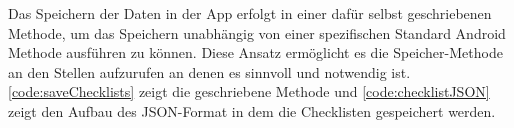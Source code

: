 Das Speichern der Daten in der App erfolgt in einer dafür selbst geschriebenen Methode, um das Speichern unabhängig von einer spezifischen Standard Android Methode ausführen zu können. Diese Ansatz ermöglicht es die Speicher-Methode an den Stellen aufzurufen an denen es sinnvoll und notwendig ist. \autoref{code:saveChecklists} zeigt die geschriebene Methode und \autoref{code:checklistJSON} zeigt den Aufbau des \ac{JSON}-Format in dem die Checklisten gespeichert werden.
\\




